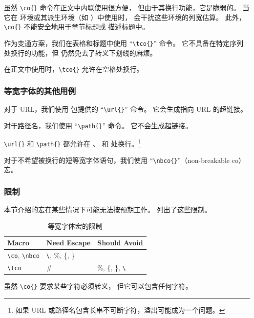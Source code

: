 虽然 \verb|\co{}| 命令在正文中内联使用很方便，
但由于其换行功能，它是脆弱的。
当它在  环境或其派生环境（如 ）中使用时，
会干扰这些环境的列宽估算。
此外，\verb|\co{}| 不能安全地用于章节标题或
描述标题中。

作为变通方案，我们在表格和标题中使用 ``\verb|\tco{}|'' 命令。
它不具备在特定序列处换行的功能，但
仍然免去了转义下划线的麻烦。

在正文中使用时，\verb|\tco{}| 允许在空格处换行。

\subsubsection{等宽字体的其他用例}
\label{sec:app:styleguide:Other Use Cases of Monospace Font}

对于 URL，我们使用  包提供的 ``\verb|\url{}|'' 命令。
它会生成指向 URL 的超链接。

对于路径名，我们使用 ``\verb|\path{}|'' 命令。
它不会生成超链接。

\verb|\url{}| 和 \verb|\path{}| 都允许在
\qco{/}、\qco{-} 和  处换行。\footnote{
  如果 URL 或路径名包含长串不可断字符，溢出可能成为一个问题。
}

对于不希望被换行的短等宽字体语句，我们使用
``\verb|\nbco{}|''（non-breakable co）宏。

\subsubsection{限制}
\label{sec:app:styleguide:Limitations}

本节介绍的宏在某些情况下可能无法按预期工作。
列出了这些限制。

\begin{table}
\renewcommand*{\arraystretch}{1.2}\centering\footnotesize
\begin{tabular}{@{}lll@{}}\toprule
  Macro &  Need Escape & Should Avoid \\
  \midrule
  \texttt{\textbackslash co}, \texttt{\textbackslash nbco} & \texttt{\textbackslash}, \%, \{, \} & \\
  \texttt{\textbackslash tco}  & \# & \%, \{, \}, \texttt{\textbackslash} \\
  \bottomrule
\end{tabular}
\caption{等宽字体宏的限制}
\label{tab:app:styleguide:Limitation of Monospace Macro}
\end{table}

虽然 \verb|\co{}| 要求某些字符必须转义，
但它可以包含任何字符。

